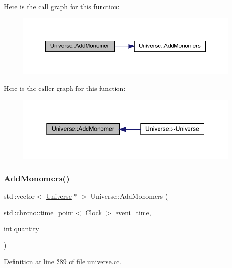 Here is the call graph for this function\+:
\nopagebreak
\begin{figure}[H]
\begin{center}
\leavevmode
\includegraphics[width=350pt]{class_universe_a062a9472f0400e566ecc7dc056d989d9_cgraph}
\end{center}
\end{figure}
Here is the caller graph for this function\+:
\nopagebreak
\begin{figure}[H]
\begin{center}
\leavevmode
\includegraphics[width=345pt]{class_universe_a062a9472f0400e566ecc7dc056d989d9_icgraph}
\end{center}
\end{figure}
\mbox{\label{class_universe_a95fe7f99971bb2048121a7c4e87b9f79}} 
\subsubsection{\texorpdfstring{Add\+Monomers()}{AddMonomers()}}
{\footnotesize\ttfamily std\+::vector$<$ \hyperlink{class_universe}{Universe} $\ast$ $>$ Universe\+::\+Add\+Monomers (\begin{DoxyParamCaption}\item[{std\+::chrono\+::time\+\_\+point$<$ \hyperlink{universe_8h_a0ef8d951d1ca5ab3cfaf7ab4c7a6fd80}{Clock} $>$}]{event\+\_\+time,  }\item[{int}]{quantity }\end{DoxyParamCaption})}



Definition at line 289 of file universe.\+cc.


